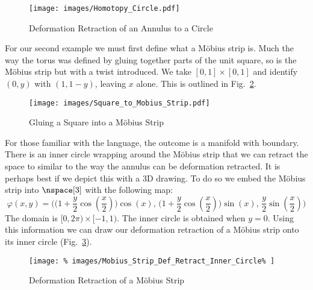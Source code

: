 \documentclass{book}                                                           %
\begin{document}
                \begin{figure}[H]
                    \centering
                    \captionsetup{type=figure}
                    \texttt{[image: images/Homotopy\_Circle.pdf]}
                    \caption{Deformation Retraction of an Annulus to a Circle}
                    \label{fig:Def_Retract_Annulus_to_Circle}
                \end{figure}
                For our second example we must first define what a M\"{o}bius
                strip is. Much the way the torus was defined by gluing together
                parts of the unit square, so is the M\"{o}bius strip but with a
                twist introduced. We take $[0,1]\times[0,1]$ and identify
                $(0,y)$ with $(1,1-y)$, leaving $x$ alone. This is outlined in
                Fig.~\ref{fig:Square_to_Mobius_Strip}.
                \begin{figure}[H]
                    \centering
                    \captionsetup{type=figure}
                    \texttt{[image: images/Square\_to\_Mobius\_Strip.pdf]}
                    \caption{Gluing a Square into a M\"{o}bius Strip}
                    \label{fig:Square_to_Mobius_Strip}
                \end{figure}
                For those familiar with the language, the outcome is a manifold
                with boundary. There is an inner circle wrapping around the
                M\"{o}bius strip that we can retract the space to similar to the
                way the annulus can be deformation retracted. It is perhaps best
                if we depict this with a 3D drawing. To do so we embed the
                M\"{o}bius strip into $\nspace[3]$ with the following map:
                \begin{equation}
                    \varphi(x,y)=
                    \Big(\big(1+\frac{y}{2}\cos(\frac{x}{2})\big)\cos(x),\,
                         \big(1+\frac{y}{2}\cos(\frac{x}{2})\big)\sin(x),\,
                         \frac{y}{2}\sin(\frac{x}{2})\Big)
                \end{equation}
                The domain is $[0,2\pi)\times[\minus{1},1)$. The inner circle is
                obtained when $y=0$. Using this information we can draw our
                deformation retraction of a M\"{o}bius strip onto its inner
                circle (Fig.~\ref{fig:Def_Retract_Mobius_Strip}).
                \begin{figure}[H]
                    \centering
                    \captionsetup{type=figure}
                    \texttt{[image: \%
                        images/Mobius\_Strip\_Def\_Retract\_Inner\_Circle\%
                    ]}
                    \caption{Deformation Retraction of a M\"{o}bius Strip}
                    \label{fig:Def_Retract_Mobius_Strip}
                \end{figure}
\end{document}
